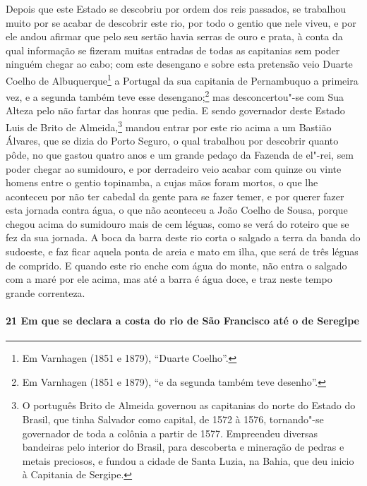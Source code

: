 Depois que este Estado se descobriu por ordem dos reis passados, se trabalhou muito por se
acabar de descobrir este rio, por todo o gentio que nele viveu, e por ele andou afirmar
que pelo seu sertão havia serras de ouro e prata, à conta da qual informação se fizeram
muitas entradas de todas as capitanias sem poder ninguém chegar ao cabo; com este
desengano e sobre esta pretensão veio Duarte Coelho de Albuquerque\footnote{ Em Varnhagen
(1851 e 1879), ``Duarte Coelho''.} a Portugal da sua capitania de Pernambuquo a primeira
vez, e a segunda também teve esse desengano;\footnote{ Em Varnhagen (1851 e 1879), ``e da
segunda também teve desenho''.} mas desconcertou"-se com Sua Alteza pelo não fartar das
honras que pedia. E sendo governador deste Estado Luis de Brito de Almeida,\footnote{ O
português Brito de Almeida governou as capitanias do norte do Estado do Brasil, que tinha
Salvador como capital, de 1572 à 1576, tornando"-se governador de toda a colônia a partir
de 1577. Empreendeu diversas bandeiras pelo interior do Brasil, para descoberta e
mineração de pedras e metais preciosos, e fundou a cidade de Santa Luzia, na Bahia, que deu
inicio à Capitania de Sergipe.} mandou entrar por este rio acima a um Bastião Álvares,
que se dizia do Porto Seguro, o qual trabalhou por descobrir quanto pôde, no que gastou
quatro anos e um grande pedaço da Fazenda de el"-rei, sem poder chegar ao sumidouro, e por
derradeiro veio acabar com quinze ou vinte homens entre o gentio topinamba, a cujas mãos
foram mortos, o que lhe aconteceu por não ter cabedal da gente para se fazer temer, e por
querer fazer esta jornada contra água, o que não aconteceu a João Coelho de Sousa, porque
chegou acima do sumidouro mais de cem léguas, como se verá do roteiro que se fez da sua
jornada. A boca da barra deste rio corta o salgado a terra da banda do sudoeste, e faz
ficar aquela ponta de areia e mato em ilha, que será de três léguas de comprido. E quando
este rio enche com água do monte, não entra o salgado com a maré por ele acima, mas até a
barra é água doce, e traz neste tempo grande correnteza.

\paragraph{21 Em que se declara a costa do rio de São Francisco até o de Seregipe}

